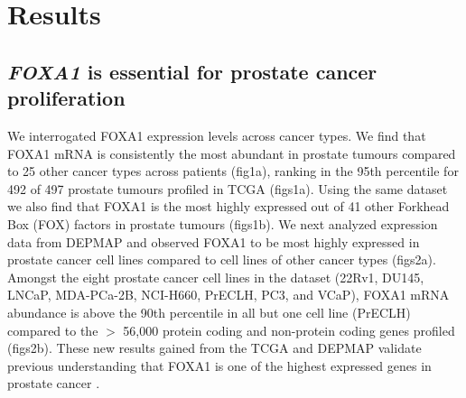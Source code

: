 \section{Results}

\subsection{\emph{FOXA1} is essential for prostate cancer proliferation}

We interrogated FOXA1 expression levels across cancer types.
We find that FOXA1 mRNA is consistently the most abundant in prostate tumours compared to 25 other cancer types across patients (fig1a), ranking in the 95th percentile for 492 of 497 prostate tumours profiled in TCGA (figs1a).
Using the same dataset we also find that FOXA1 is the most highly expressed out of 41 other Forkhead Box (FOX) factors in prostate tumours (figs1b).
We next analyzed expression data from DEPMAP and observed FOXA1 to be most highly expressed in prostate cancer cell lines compared to cell lines of other cancer types (figs2a).
Amongst the eight prostate cancer cell lines in the dataset (22Rv1, DU145, LNCaP, MDA-PCa-2B, NCI-H660, PrECLH, PC3, and VCaP), FOXA1 mRNA abundance is above the 90th percentile in all but one cell line (PrECLH) compared to the  $>$  56,000 protein coding and non-protein coding genes profiled (figs2b).
These new results gained from the TCGA and DEPMAP validate previous understanding that FOXA1 is one of the highest expressed genes in prostate cancer \cite{tsourlakisFOXA1ExpressionStrong2017}.


